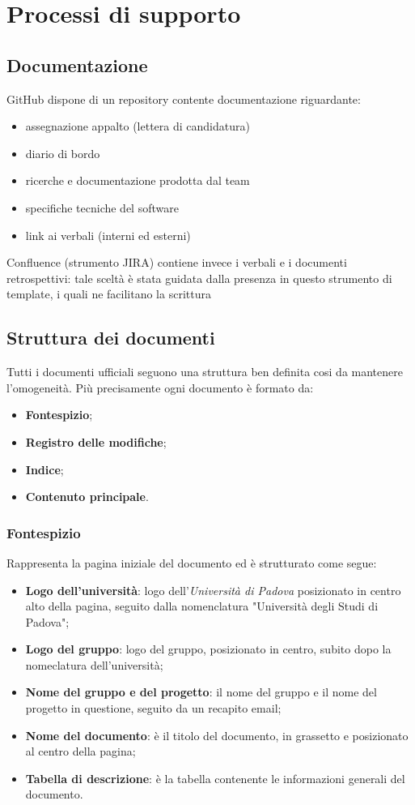 \section{Processi di supporto}

\subsection{Documentazione}
GitHub dispone di un repository contente documentazione riguardante:
\begin{itemize}
    \item assegnazione appalto (lettera di candidatura)
    \item diario di bordo
    \item ricerche e documentazione prodotta dal team
    \item specifiche tecniche del software
    \item link ai verbali (interni ed esterni)
\end{itemize}
Confluence (strumento JIRA) contiene invece i verbali e i documenti retrospettivi: tale sceltà è stata guidata dalla presenza in questo strumento di template, i quali ne facilitano la scrittura

\subsection{Struttura dei documenti}
Tutti i documenti ufficiali seguono una struttura ben definita cosi da mantenere l'omogeneità. Più precisamente ogni documento è formato da:
\begin{itemize}
    \item \textbf{Fontespizio};
    \item \textbf{Registro delle modifiche};
    \item \textbf{Indice};
    \item \textbf{Contenuto principale}.
\end{itemize}
	
\subsubsection{Fontespizio}
Rappresenta la pagina iniziale del documento ed è strutturato come segue:
\begin{itemize}
    \item \textbf{Logo dell'università}: logo dell'\textit{Università di Padova} posizionato in centro alto della pagina, seguito dalla nomenclatura "Università degli  Studi di Padova";
    \item \textbf{Logo del gruppo}: logo del gruppo, posizionato in centro, subito dopo la nomeclatura dell'università;
    \item \textbf{Nome del gruppo e del progetto}: il nome del gruppo e il nome del progetto in questione, seguito da un recapito email;
    \item \textbf{Nome del documento}: è il titolo del documento, in grassetto e posizionato al centro della pagina;
    \item \textbf{Tabella di descrizione}: è la tabella contenente le informazioni generali del documento.
\end{itemize}

